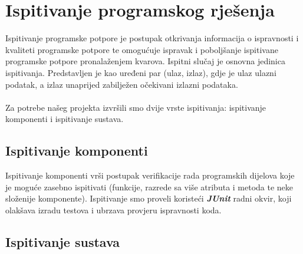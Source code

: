 			
			\eject 
		
	
		\section{Ispitivanje programskog rješenja}
			
			
	
			Ispitivanje programske potpore je postupak otkrivanja informacija o ispravnosti i kvaliteti programske potpore te omogućuje ispravak i poboljšanje ispitivane programske potpore pronalaženjem kvarova. Ispitni slučaj je osnovna jedinica ispitivanja. Predstavljen je kao uređeni par (ulaz, izlaz), gdje je ulaz ulazni podatak, a izlaz unaprijed zabilježen očekivani izlazni podataka. \\ \\
			Za potrebe našeg projekta izvršili smo dvije vrste ispitivanja: ispitivanje komponenti i  ispitivanje sustava. 
			
			
			\subsection{Ispitivanje komponenti}
			
			Ispitivanje komponenti vrši postupak verifikacije rada programskih dijelova koje je moguće zasebno ispitivati (funkcije, razrede sa više atributa i metoda te neke složenije komponente). Ispitivanje smo proveli koristeći \textit{\textbf{JUnit}} radni okvir, koji olakšava izradu testova i ubrzava provjeru ispravnosti koda.
			
			
			
			\subsection{Ispitivanje sustava}
			
